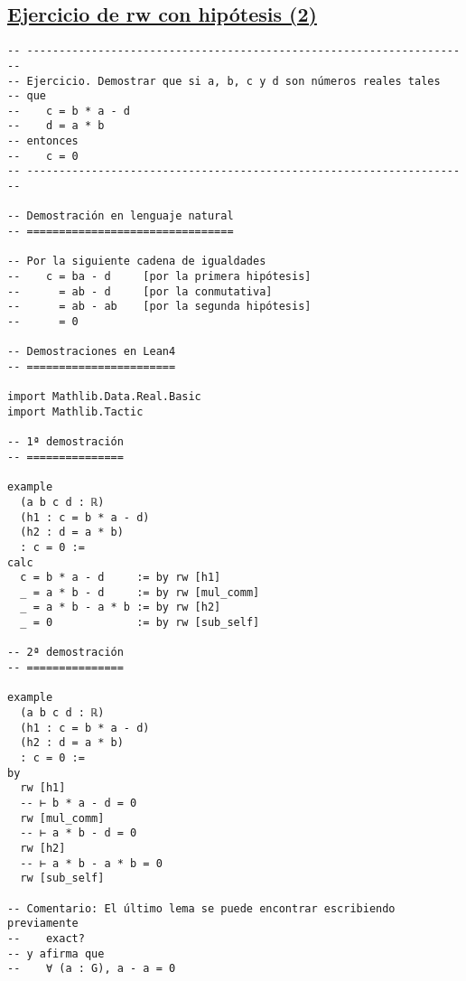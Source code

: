 \subsection{\href{./src/Basicos/Ejercicio\_de\_rw\_sobre\_hipotesis\_2.lean}{Ejercicio de rw con hipótesis (2)}}
\label{sec:org04f93a3}
\begin{verbatim}
-- ---------------------------------------------------------------------
-- Ejercicio. Demostrar que si a, b, c y d son números reales tales
-- que
--    c = b * a - d
--    d = a * b
-- entonces
--    c = 0
-- ---------------------------------------------------------------------

-- Demostración en lenguaje natural
-- ================================

-- Por la siguiente cadena de igualdades
--    c = ba - d     [por la primera hipótesis]
--      = ab - d     [por la conmutativa]
--      = ab - ab    [por la segunda hipótesis]
--      = 0

-- Demostraciones en Lean4
-- =======================

import Mathlib.Data.Real.Basic
import Mathlib.Tactic

-- 1ª demostración
-- ===============

example
  (a b c d : ℝ)
  (h1 : c = b * a - d)
  (h2 : d = a * b)
  : c = 0 :=
calc
  c = b * a - d     := by rw [h1]
  _ = a * b - d     := by rw [mul_comm]
  _ = a * b - a * b := by rw [h2]
  _ = 0             := by rw [sub_self]

-- 2ª demostración
-- ===============

example
  (a b c d : ℝ)
  (h1 : c = b * a - d)
  (h2 : d = a * b)
  : c = 0 :=
by
  rw [h1]
  -- ⊢ b * a - d = 0
  rw [mul_comm]
  -- ⊢ a * b - d = 0
  rw [h2]
  -- ⊢ a * b - a * b = 0
  rw [sub_self]

-- Comentario: El último lema se puede encontrar escribiendo previamente
--    exact?
-- y afirma que
--    ∀ (a : G), a - a = 0
\end{verbatim}

